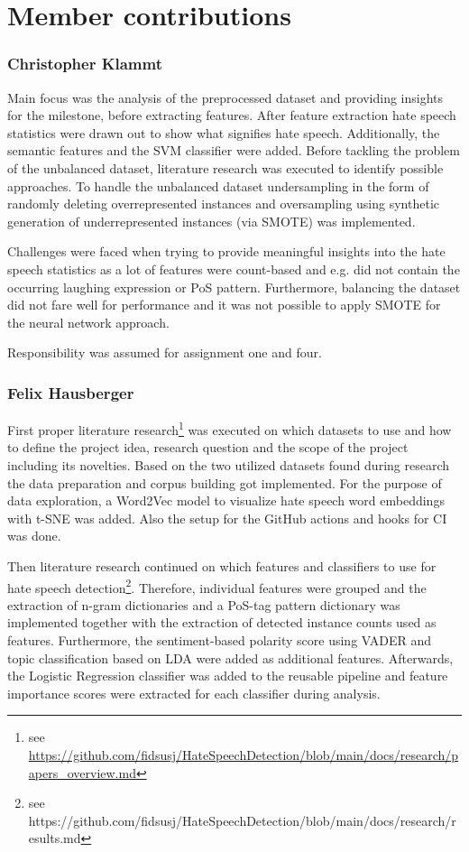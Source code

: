 \section*{Member contributions}

\subsubsection*{Christopher Klammt}

Main focus was the analysis of the preprocessed dataset and providing insights for the milestone, before extracting features. After feature extraction hate speech statistics were drawn out to show what signifies hate speech. Ad\-di\-tio\-nal\-ly, the semantic features and the SVM classifier were added. Before tackling the problem of the unbalanced dataset, literature research was executed to identify possible approaches. To handle the unbalanced dataset undersampling in the form of randomly deleting over\-re\-pre\-sen\-ted instances and oversampling using synthetic generation of underrepresented instances (via SMOTE) was implemented.

Challenges were faced when trying to provide meaningful insights into the hate speech statistics as a lot of features were count-based and e.g. did not contain the occurring laughing expression or PoS pattern. Furthermore, balancing the dataset did not fare well for performance and it was not possible to apply SMOTE for the neural network approach.

Responsibility was assumed for assignment one and four.

\subsubsection*{Felix Hausberger}

First proper literature research\footnote{see \url{https://github.com/fidsusj/HateSpeechDetection/blob/main/docs/research/papers_overview.md}} was executed on which datasets to use and how to define the project idea, research question and the scope of the project including its novelties. Based on the two utilized datasets found during research the data preparation and corpus building got implemented. For the purpose of data exploration, a Word2Vec model to visualize hate speech word embeddings with t-SNE was added. Also the setup for the GitHub actions and hooks for CI was done.

Then literature research continued on which features and classifiers to use for hate speech detection\footnote{see https://github.com/fidsusj/HateSpeechDetection/blob/main/docs/research/results.md}. Therefore, individual features were grouped and the extraction of n-gram dictionaries and a PoS-tag pattern dictionary was implemented together with the extraction of detected instance counts used as features. Furthermore, the sentiment-based polarity score using VADER and topic classification based on LDA were added as additional features. Afterwards, the Logistic Regression classifier was added to the reusable pipeline and feature importance scores were extracted for each classifier during analysis.

